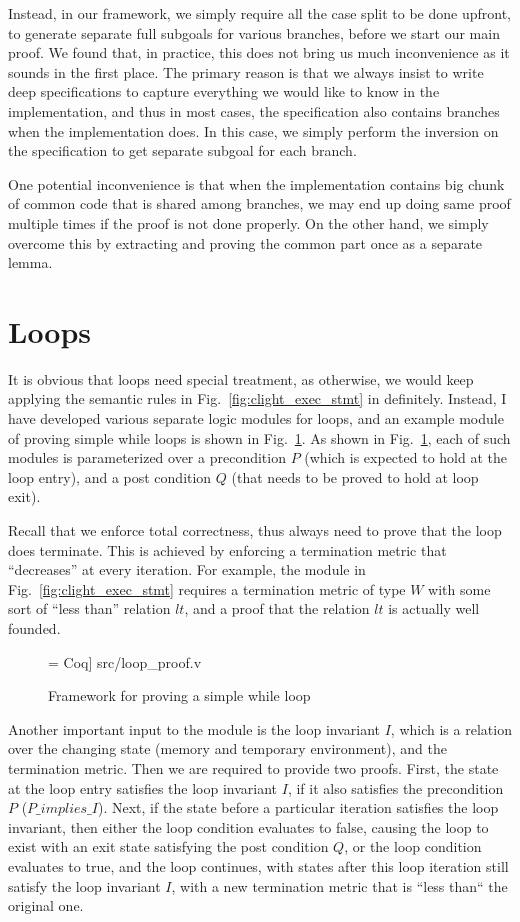 Instead, in our framework, we simply require all the case split to be done upfront,
to generate separate full subgoals for various branches, before we start our main
proof. We found that, in practice, this does not bring us much inconvenience as
it sounds in the first place. The primary reason is that we always insist to
write deep specifications to capture everything we would like to know in the
implementation, and thus in most cases, the specification also contains branches
when the implementation does. In this case, we simply perform the inversion
on the specification to get separate subgoal for each branch.

One potential inconvenience is that when the implementation contains big
chunk of common code that is shared among branches, we may end up doing
same proof multiple times if the proof is not done properly. On the other
hand, we simply overcome this by extracting and proving the common part once
as a separate lemma.

\section{Loops}

It is obvious that loops need special treatment, as otherwise, we would keep
applying the semantic rules in Fig.~\ref{fig:clight_exec_stmt} in definitely.
Instead, I have developed various separate logic modules for loops, and
an example module of proving simple while loops is shown in Fig.~\ref{fig:loop_proof}.
As shown in Fig.~\ref{fig:loop_proof}, each of such modules is parameterized
over a precondition $P$ (which is expected to hold at the loop entry), and
a post condition $Q$ (that needs to be proved to hold at loop exit).

Recall that we enforce total correctness, thus always need to prove that
the loop does terminate. This is achieved by enforcing a termination metric that
``decreases'' at every iteration.
For example, the module in Fig.~\ref{fig:clight_exec_stmt} requires a termination
metric of type $W$ with some sort of ``less than'' relation $lt$, and a proof
that the relation $lt$ is actually well founded.


\begin{figure}
 = Coq] {src/loop_proof.v}
\caption{Framework for proving a simple while loop}
\label{fig:loop_proof}
\end{figure}

Another important input to the module is the loop invariant $I$, which is
a relation over the changing state (memory and temporary environment), and
the termination metric. Then we are required to provide two proofs.
First, the state at the loop entry satisfies the loop invariant $I$,
if it also satisfies the precondition $P$ ($P\_implies\_I$).
Next, if the state before a particular iteration satisfies the loop
invariant, then either the loop condition evaluates to false, causing
the loop to exist with an exit state satisfying the post condition $Q$,
or the loop condition evaluates to true, and the loop continues, with
states after this loop iteration still satisfy the loop invariant $I$,
with a new termination metric that is ``less than`` the original one.

